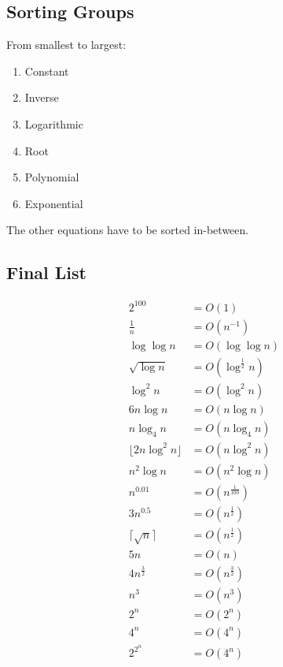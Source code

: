 \documentclass{article}
\begin{document}
\subsection{Sorting Groups}

From smallest to largest:
\begin{enumerate}
    \item Constant
    \item Inverse
    \item Logarithmic
    \item Root
    \item Polynomial
    \item Exponential
\end{enumerate}

\vspace{5mm}
The other equations have to be sorted in-between.

\subsection{Final List}
\setcounter{equation}{0}
\begin{align}
    2^{100} &= O(1) \\
    \frac{1}{n} &= O(n^{-1}) \\
    \log \log n &= O(\log \log n) \\
    \sqrt{\log n} &= O(\log^{\frac{1}{2}}n) \\
    \log^2 n &= O(\log^2 n) \\
    6n\log n &= O(n\log n) \\
    n \log_4 n &= O(n \log_4 n) \\
    \lfloor 2n \log^2n \rfloor &= O(n \log^2n) \\
    n^2 \log n &= O(n^2 \log n) \\
    n^{0.01} &= O(n^{\frac{1}{100}}) \\
    3n^{0.5} &= O(n^{\frac{1}{2}}) \\
    \lceil \sqrt{n} \rceil &= O(n^{\frac{1}{2}}) \\
    5n &= O(n) \\
    4n^{\frac{3}{2}} &= O(n^{\frac{3}{2}}) \\
    n^3 &= O(n^3) \\
    2^n &= O(2^n) \\
    4^n &= O(4^n) \\
    2^{2^{n}} &= O(4^{n})
\end{align}
\end{document}
